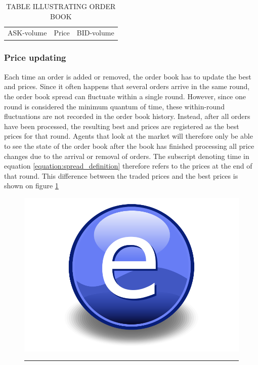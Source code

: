 \begin{table}
\centering
\begin{tabular}{ccc}
ASK-volume & Price & BID-volume
\end{tabular}
\caption{TABLE ILLUSTRATING ORDER BOOK}\label{table:example_order_book}
\end{table}



\subsubsection{Price updating}
Each time an order is added or removed, the order book has to update the best \bid{} and \ask{} prices. Since it often happens that several orders arrive in the same round, the order book spread can fluctuate within a single round. However, since one round is considered the minimum quantum of time,  these within-round fluctuations are not recorded in the order book history. Instead, after all orders have been processed, the resulting best \bid{} and \ask{} prices are registered as the best prices for that round. Agents that look at the market will therefore only be able to see the state of the order book after the book has finished processing all price changes due to the arrival or removal of orders. The subscript denoting time in equation \ref{equation:spread_definition} therefore refers to the prices at the end of that round. This difference between the traded prices and the best prices is shown on figure \ref{fig:within_round_price_fluctuations}

\begin{figure}[htbp]
	\centering
		\includegraphics{Figures/Electron.pdf}
		\rule{35em}{0.5pt}
	\caption{}
	\label{fig:within_round_price_fluctuations}
\end{figure}

